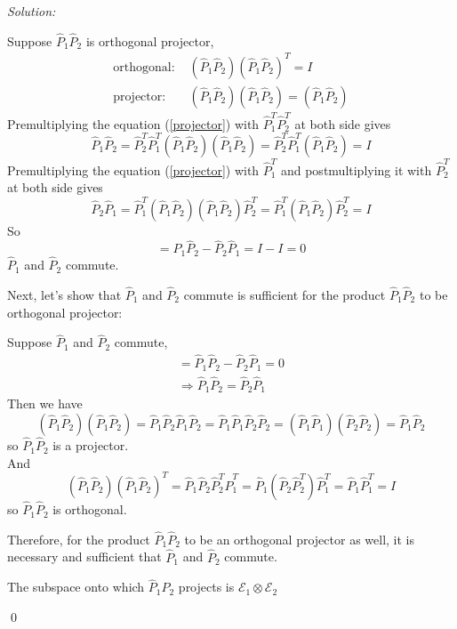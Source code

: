 \documentclass[12pt,a4paper]{article}
\newenvironment{sol}
    {\emph{Solution:}
    }
    {
    \qed
    }
\begin{document}
\begin{sol}
Suppose $\hat{P}_1\hat{P}_2$ is orthogonal projector,
\begin{align}
\text{orthogonal: }&(\hat{P}_1\hat{P}_2)(\hat{P}_1\hat{P}_2)^T=I\\
\label{projector}\text{projector: }&(\hat{P}_1\hat{P}_2)(\hat{P}_1\hat{P}_2)=(\hat{P}_1\hat{P}_2)
\end{align}
Premultiplying the equation (\ref{projector}) with $\hat{P}_1^T\hat{P}_2^T$ at both side gives
\begin{equation}
\hat{P}_1\hat{P}_2=\hat{P}_2^T\hat{P}_1^T(\hat{P}_1\hat{P}_2)(\hat{P}_1\hat{P}_2)=\hat{P}_2^T\hat{P}_1^T(\hat{P}_1\hat{P}_2)=I
\end{equation}
Premultiplying the equation (\ref{projector}) with $\hat{P}_1^T$ and postmultiplying it with $\hat{P}_2^T$ at both side gives
\begin{equation}
\hat{P}_2\hat{P}_1=\hat{P}_1^T(\hat{P}_1\hat{P}_2)(\hat{P}_1\hat{P}_2)\hat{P}_2^T=\hat{P}_1^T(\hat{P}_1\hat{P}_2)\hat{P}_2^T=I
\end{equation}
So
\begin{equation}
[\hat{P}_1,\hat{P}_2]=\hat{P}_1\hat{P}_2-\hat{P}_2\hat{P}_1=I-I=0
\end{equation}
$\hat{P}_1$ and $\hat{P}_2$ commute.

Next, let's show that $\hat{P}_1$ and $\hat{P}_2$ commute is sufficient for the product $\hat{P}_1\hat{P}_2$ to be orthogonal projector:

Suppose $\hat{P}_1$ and $\hat{P}_2$ commute,
\begin{gather}
[\hat{P}_1,\hat{P}_2]=\hat{P}_1\hat{P}_2-\hat{P}_2\hat{P}_1=0\\
\Longrightarrow\hat{P}_1\hat{P}_2=\hat{P}_2\hat{P}_1
\end{gather}
Then we have
\begin{equation}
(\hat{P}_1\hat{P}_2)(\hat{P}_1\hat{P}_2)=\hat{P}_1\hat{P}_2\hat{P}_1\hat{P}_2=\hat{P}_1\hat{P}_1\hat{P}_2\hat{P}_2=(\hat{P}_1\hat{P}_1)(\hat{P}_2\hat{P}_2)=\hat{P}_1\hat{P}_2
\end{equation}
so $\hat{P}_1\hat{P}_2$ is a projector.\\
And
\begin{equation}
(\hat{P}_1\hat{P}_2)(\hat{P}_1\hat{P}_2)^T=\hat{P}_1\hat{P}_2\hat{P}_2^T\hat{P}_1^T=\hat{P}_1(\hat{P}_2\hat{P}_2^T)\hat{P}_1^T=\hat{P}_1\hat{P}_1^T=I
\end{equation}
so $\hat{P}_1\hat{P}_2$ is orthogonal.

Therefore, for the product $\hat{P}_1\hat{P}_2$ to be an orthogonal projector as well, it is necessary and sufficient that $\hat{P}_1$ and $\hat{P}_2$ commute.

The subspace onto which $\hat{P}_1\hat{P}_2$ projects is $\mathcal{E}_1\otimes\mathcal{E}_2$
\end{sol}
\end{document}
